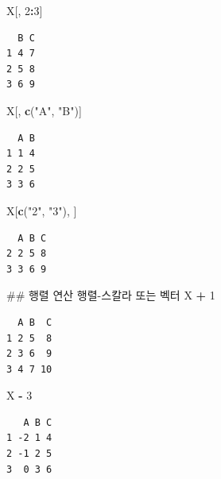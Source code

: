 \documentclass[11pt,a4paper]{book}
\newenvironment{Shaded}{\begin{snugshade}}{\end{snugshade}}
\newcommand{\KeywordTok}[1]{\textcolor[rgb]{0.13,0.29,0.53}{\textbf{#1}}}
\newcommand{\DecValTok}[1]{\textcolor[rgb]{0.00,0.00,0.81}{#1}}
\newcommand{\StringTok}[1]{\textcolor[rgb]{0.31,0.60,0.02}{#1}}
\newcommand{\OperatorTok}[1]{\textcolor[rgb]{0.81,0.36,0.00}{\textbf{#1}}}
\newcommand{\NormalTok}[1]{#1}
\theoremstyle{definition}
\theoremstyle{definition}
\theoremstyle{definition}
\theoremstyle{remark}
\begin{document}
\begin{Shaded}
\begin{Highlighting}[]
\NormalTok{X[, }\DecValTok{2}\OperatorTok{:}\DecValTok{3}\NormalTok{]}
\end{Highlighting}
\end{Shaded}

\begin{verbatim}
  B C
1 4 7
2 5 8
3 6 9
\end{verbatim}

\begin{Shaded}
\begin{Highlighting}[]
\NormalTok{X[, }\KeywordTok{c}\NormalTok{(}\StringTok{"A"}\NormalTok{, }\StringTok{"B"}\NormalTok{)]}
\end{Highlighting}
\end{Shaded}

\begin{verbatim}
  A B
1 1 4
2 2 5
3 3 6
\end{verbatim}

\begin{Shaded}
\begin{Highlighting}[]
\NormalTok{X[}\KeywordTok{c}\NormalTok{(}\StringTok{"2"}\NormalTok{, }\StringTok{"3"}\NormalTok{), ]}
\end{Highlighting}
\end{Shaded}

\begin{verbatim}
  A B C
2 2 5 8
3 3 6 9
\end{verbatim}

\begin{Shaded}
\begin{Highlighting}[]
\NormalTok{## 행렬 연산 행렬-스칼라 또는 벡터}
\NormalTok{X }\OperatorTok{+}\StringTok{ }\DecValTok{1}
\end{Highlighting}
\end{Shaded}

\begin{verbatim}
  A B  C
1 2 5  8
2 3 6  9
3 4 7 10
\end{verbatim}

\begin{Shaded}
\begin{Highlighting}[]
\NormalTok{X }\OperatorTok{-}\StringTok{ }\DecValTok{3}
\end{Highlighting}
\end{Shaded}

\begin{verbatim}
   A B C
1 -2 1 4
2 -1 2 5
3  0 3 6
\end{verbatim}
\end{document}
